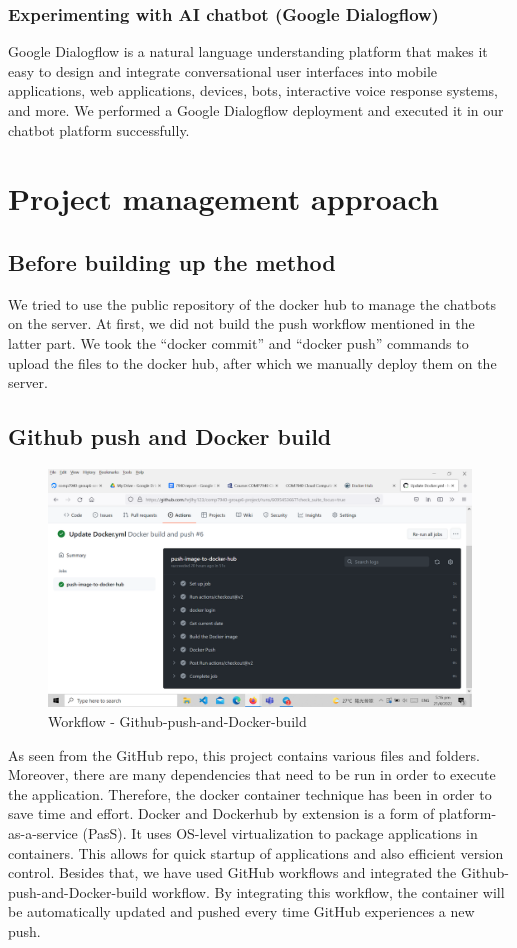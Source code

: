 \documentclass[conference]{IEEEtran}
\begin{document}
\subsubsection*{Experimenting with AI chatbot (Google Dialogflow)}
Google Dialogflow is a natural language understanding platform that makes it easy to design and integrate conversational user interfaces into mobile applications, web applications, devices, bots, interactive voice response systems, and more. We performed a Google Dialogflow deployment and executed it in our chatbot platform successfully.

\section{Project management approach}
\subsection*{Before building up the method}
We tried to use the public repository of the docker hub to manage the chatbots on the server. At first, we did not build the push workflow mentioned in the latter part. We took the “docker commit” and “docker push” commands to upload the files to the docker hub, after which we manually deploy them on the server.
\subsection*{Github push and Docker build}
\begin{figure}[h]
\includegraphics[scale=0.155]{13} 
\caption{Workflow - Github-push-and-Docker-build}
\end{figure}
As seen from the GitHub repo, this project contains various files and folders. Moreover, there are many dependencies that need to be run in order to execute the application. Therefore, the docker container technique has been in order to save time and effort.
Docker and Dockerhub by extension is a form of platform-as-a-service (PasS). It uses OS-level virtualization to package applications in containers. This allows for quick startup of applications and also efficient version control. Besides that, we have used GitHub workflows and integrated the Github-push-and-Docker-build workflow. By integrating this workflow, the container will be automatically updated and pushed every time GitHub experiences a new push.
\end{document}
